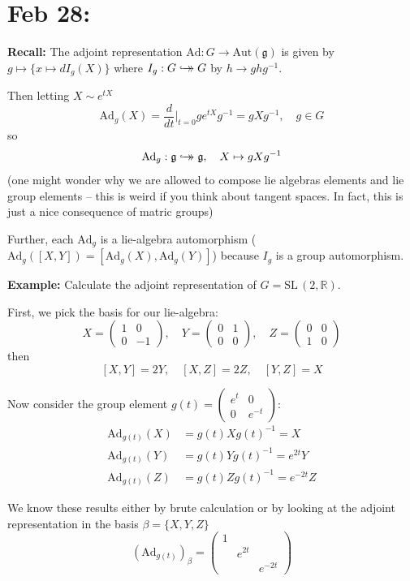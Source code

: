 \documentclass[12pt]{article}
\newcommand{\R}{\mathbb{R}}
\newcommand{\SL}{\text{SL}\,}
\newcommand{\biject}{\hookrightarrow \hspace{-8pt} \rightarrow}
\newcommand{\g}{\mathfrak{g}}
\begin{document}
\section{Feb 28:}
    \textbf{Recall:} The adjoint representation $\text{Ad}: G \to \text{Aut}(\g)$ is given by $g \mapsto \{x \mapsto dI_g(X)\}$ where $I_g: G \biject G$ by $h \to ghg^{-1}$. 

    Then letting $X \sim e^{tX}$ 
    \[\text{Ad}_g(X) = \frac{d}{dt}\bigg\vert_{t=0} ge^{tX}g^{-1} = gXg^{-1}, \quad g \in G\]
    so 
    \[\text{Ad}_g: \g \biject \g, \quad X \mapsto gXg^{-1}\]
    (one might wonder why we are allowed to compose lie algebras elements and lie group elements -- this is weird if you think about tangent spaces. In fact, this is just a nice consequence of matric groups)

    Further, each $\text{Ad}_g$ is a lie-algebra automorphism ($\text{Ad}_g([X, Y]) = [\text{Ad}_g(X), \text{Ad}_g(Y)]$) because $I_g$ is a group automorphism. 

    \textbf{Example:} Calculate the adjoint representation of $G = \SL(2, \R)$. 

    First, we pick the basis for our lie-algebra: 
    \[X = \begin{pmatrix}
        1 & 0\\ 
        0 & -1
    \end{pmatrix}, \quad Y = \begin{pmatrix}
        0 & 1\\ 
        0 & 0
    \end{pmatrix}, \quad Z = \begin{pmatrix}
        0 & 0\\ 
        1 & 0
    \end{pmatrix}\]
    then 
    \[[X, Y] = 2Y, \quad [X, Z] = 2Z, \quad [Y, Z] = X\]

    Now consider the group element $g(t) = \begin{pmatrix}
        e^t & 0\\ 
        0 & e^{-t}
    \end{pmatrix}$: 
    \begin{align*}
        \text{Ad}_{g(t)}(X) &= g(t) X g(t)^{-1} = X\\
        \text{Ad}_{g(t)}(Y) &= g(t) Y g(t)^{-1} = e^{2t}Y\\
        \text{Ad}_{g(t)}(Z) &= g(t) Z g(t)^{-1} = e^{-2t}Z
    \end{align*}

    We know these results either by brute calculation or by looking at the adjoint representation in the basis $\beta = \{X, Y, Z\}$ 
    \[(\text{Ad}_{g(t)})_{\beta} = \begin{pmatrix}
        1\\ 
        & e^{2t}\\ 
        & & e^{-2t}
    \end{pmatrix}\]
\end{document}
